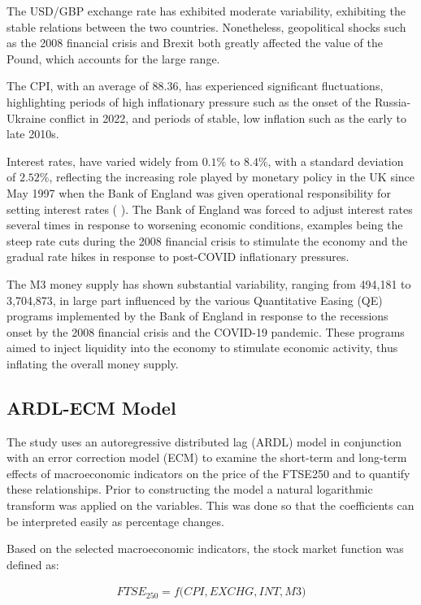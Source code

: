 \documentclass[11pt,a4paper]{article}
\newcommand{\citeboth}[1]{\citeauthor{#1} \citep{#1}}
\begin{document}
The USD/GBP exchange rate has exhibited moderate variability, exhibiting the stable relations between 
the two countries. Nonetheless, geopolitical shocks such as the 2008 financial crisis and Brexit both greatly affected the value of the Pound, 
which accounts for the large range. 

The CPI, with an average of 88.36, has 
experienced significant fluctuations, highlighting periods of high inflationary pressure such as the onset of the Russia-Ukraine conflict in 2022, and periods of stable, low
inflation such as the early to late 2010s.

Interest rates, have varied widely from $0.1\%$ to $8.4\%$, with a standard deviation of $2.52\%$, reflecting the 
increasing role played by monetary policy in the UK since May 1997 when the Bank of England was given operational responsibility for setting interest rates (\citeboth{king1997changes}). The Bank of England was forced to adjust interest rates 
several times in response to worsening economic conditions, examples being the steep rate cuts during the 2008 financial crisis to stimulate the economy and the gradual rate hikes in response to 
post-COVID inflationary pressures. 

The M3 money supply has shown substantial variability, ranging from 494,181 to 3,704,873, 
in large part influenced by the various Quantitative Easing (QE) programs implemented by the Bank of England 
in response to the recessions onset by the 2008 financial crisis and the COVID-19 pandemic. These programs aimed to inject liquidity into the economy to stimulate economic activity, thus inflating the overall money supply.

\subsection{ARDL-ECM Model}

The study uses an autoregressive distributed lag (ARDL) model in conjunction with 
an error correction model (ECM) to examine the short-term and long-term effects of macroeconomic indicators on the price of the FTSE250
and to quantify these relationships. Prior to constructing the model a natural logarithmic transform was applied
on the variables. This was done so that the coefficients can be interpreted easily as percentage changes. 

Based on the selected macroeconomic indicators,
the stock market function was defined as:

\begin{align}
    FTSE_{250} = f\biggl(CPI, EXCHG, INT, M3\biggr) \label{eq:implicit}
\end{align}
\end{document}
